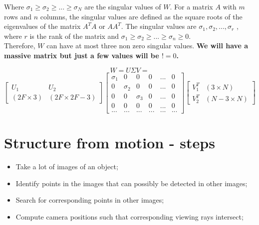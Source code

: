 \documentclass{article}
\begin{document}
Where $\sigma_1 \geq \sigma_2 \geq ... \geq \sigma_N$ are the singular values of $W$. For a matrix $A$ with $m$ rows and $n$ columns, the singular values are defined as the square roots of the eigenvalues of the matrix $A^T A$ or $AA^T$. The singular values are $\sigma_1, \sigma_2, ..., \sigma_r$ , where $r$ is the rank of the matrix and $\sigma_1 \geq \sigma_2 \geq ... \geq \sigma_n \geq 0$. \\

Therefore, $W$ can have at most three non zero singular values. \textbf{We will have a massive matrix but just a few values will be $!= 0$.}

\begin{equation*}
    W = U \Sigma V =
\end{equation*}
\begin{equation*}
    \begin{bmatrix}
        U_1 & U_2\\
        (2F\times 3) & (2F\times 2F -3)
    \end{bmatrix}
    \begin{bmatrix}
        \sigma_1 & 0 & 0 & 0 & ... & 0 \\
        0 & \sigma_2 & 0 & 0 & ... & 0 \\
        0 & 0 & \sigma_3 & 0 & ... & 0 \\
        0 & 0 & 0 & 0 & ... & 0 \\
        ... & ... & ... & ... & ... & ...
    \end{bmatrix}
    \begin{bmatrix}
        V_1^T & (3\times N)\\
        V_2^T & (N-3\times N)
    \end{bmatrix}
\end{equation*}

\newpage

\section*{Structure from motion - steps}

\begin{itemize}
    \item Take a lot of images of an object;
    \item Identify points in the images that can possibly be detected in other images;
    \item Search for corresponding points in other images;
    \item Compute camera positions such that corresponding viewing rays intersect;
\end{itemize}
\end{document}
